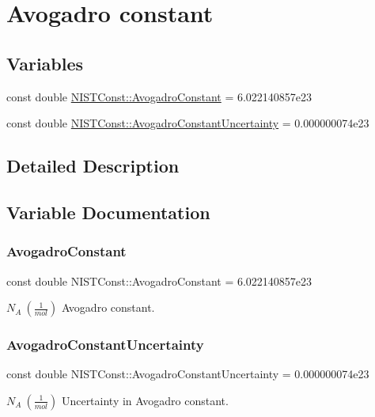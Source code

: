 \hypertarget{group___avogadro_constant}{}\section{Avogadro constant}
\label{group___avogadro_constant}
\subsection*{Variables}
\begin{DoxyCompactItemize}
\item 
const double \hyperlink{group___avogadro_constant_gad82b2a4777628c4e67a87b8f5b99174e}{N\+I\+S\+T\+Const\+::\+Avogadro\+Constant} = 6.\+022140857e23
\item 
const double \hyperlink{group___avogadro_constant_ga38f3e71e31d844bbfe2dfacf7100c4d1}{N\+I\+S\+T\+Const\+::\+Avogadro\+Constant\+Uncertainty} = 0.\+000000074e23
\end{DoxyCompactItemize}


\subsection{Detailed Description}


\subsection{Variable Documentation}
\mbox{\label{group___avogadro_constant_gad82b2a4777628c4e67a87b8f5b99174e}} 
\subsubsection{\texorpdfstring{Avogadro\+Constant}{AvogadroConstant}}
{\footnotesize\ttfamily const double N\+I\+S\+T\+Const\+::\+Avogadro\+Constant = 6.\+022140857e23}

$N_A \ (\frac{1}{mol})$ Avogadro constant. \mbox{\label{group___avogadro_constant_ga38f3e71e31d844bbfe2dfacf7100c4d1}} 
\subsubsection{\texorpdfstring{Avogadro\+Constant\+Uncertainty}{AvogadroConstantUncertainty}}
{\footnotesize\ttfamily const double N\+I\+S\+T\+Const\+::\+Avogadro\+Constant\+Uncertainty = 0.\+000000074e23}

$N_A \ (\frac{1}{mol})$ Uncertainty in Avogadro constant. 